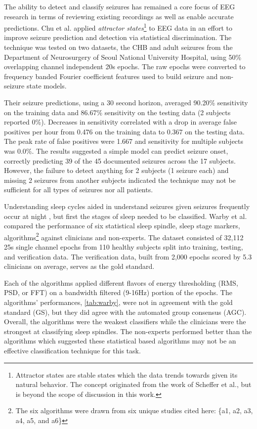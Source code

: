 The ability to detect and classify seizures has remained a core focus of \ac{EEG} research in terms of reviewing existing recordings as well as enable accurate predictions. Chu et al. \cite{Chu2017} applied \emph{attractor states}\footnote{Attractor states are stable states which the data trends towards given its natural behavior. The concept originated from the work of Scheffer et al.\cite{Scheffer2009}, but is beyond the scope of discussion in this work.} to \ac{EEG} data in an effort to improve seizure prediction and detection via statistical discrimination. The technique was tested on two datasets, the \ac{CHB} and adult seizures from the Department of Neurosurgery of Seoul National University Hospital, using 50\% overlapping channel independent 20s epochs. The raw epochs were converted to frequency banded Fourier coefficient features used to build seizure and non-seizure state models.

Their seizure predictions, using a 30 second horizon, averaged 90.20\% sensitivity on the training data and 86.67\% sensitivity on the testing data (2 subjects reported 0\%). Decreases in sensitivity correlated with a drop in average false positives per hour from 0.476 on the training data to 0.367 on the testing data. The peak rate of false positives were 1.667 and sensitivity for multiple subjects was 0.0\%. The results suggested a simple model can predict seizure onset, correctly predicting 39 of the 45 documented seizures across the 17 subjects. However, the failure to detect anything for 2 subjects (1 seizure each) and missing 2 seizures from another subjects indicated the technique may not be sufficient for all types of seizures nor all patients. 

Understanding sleep cycles aided in understand seizures given seizures frequently occur at night \cite{Ramgopal2014}, but first the stages of sleep needed to be classified. Warby et al.\cite{Warby2014} compared the performance of six statistical sleep spindle, sleep stage markers, algorithms\footnote{The six algorithms were drawn from six unique studies cited here: \{a1\cite{Martin2013}, a2\cite{Ferrarelli2007}, a3\cite{Wamsley2012}, a4\cite{Molle2002}, a5\cite{Bodizs2009}, and a6\cite{Wendt2012}\}} against clinicians and non-experts. The dataset consisted of 32,112 25s single channel epochs from 110 healthy subjects split into training, testing, and verification data. The verification data, built from 2,000 epochs scored by 5.3 clinicians on average, serves as the gold standard.

Each of the algorithms applied different flavors of energy thresholding (\ac{RMS}, \ac{PSD}, or \ac{FFT}) on a bandwidth filtered (9-16Hz) portion of the epochs. The algorithms' performances, \cref{tab:warby}, were not in agreement with the gold standard (GS), but they did agree with the automated group consensus (AGC). Overall, the algorithms were the weakest classifiers while the clinicians were the strongest at classifying sleep spindles. The non-experts performed better than the algorithms which suggested these statistical based algorithms may not be an effective classification technique for this task.

